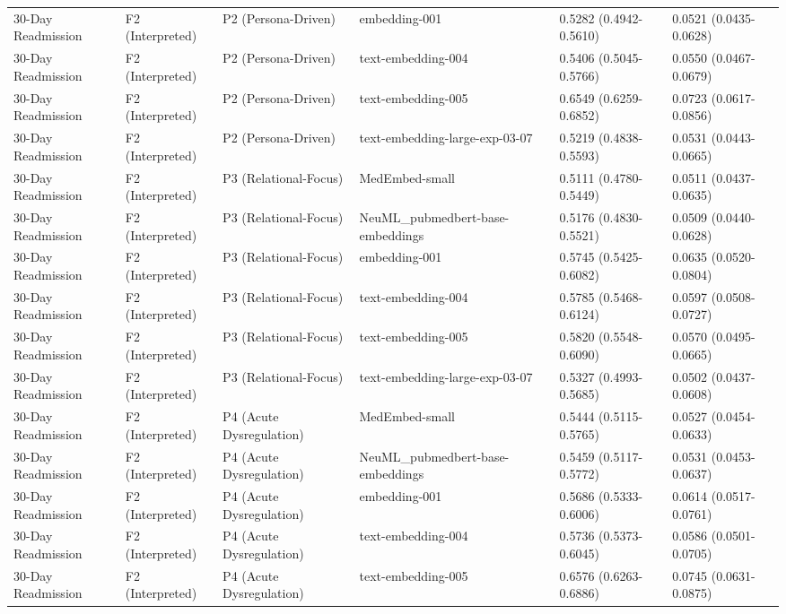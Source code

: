 \documentclass[border=0pt]{standalone}
\begin{document}
\begin{adjustbox}{width=\textwidth}
\begin{tabular}{llllll}
30-Day Readmission & F2 (Interpreted) & P2 (Persona-Driven) & embedding-001 & 0.5282 (0.4942-0.5610) & 0.0521 (0.0435-0.0628) \\
30-Day Readmission & F2 (Interpreted) & P2 (Persona-Driven) & text-embedding-004 & 0.5406 (0.5045-0.5766) & 0.0550 (0.0467-0.0679) \\
30-Day Readmission & F2 (Interpreted) & P2 (Persona-Driven) & text-embedding-005 & 0.6549 (0.6259-0.6852) & 0.0723 (0.0617-0.0856) \\
30-Day Readmission & F2 (Interpreted) & P2 (Persona-Driven) & text-embedding-large-exp-03-07 & 0.5219 (0.4838-0.5593) & 0.0531 (0.0443-0.0665) \\
30-Day Readmission & F2 (Interpreted) & P3 (Relational-Focus) & MedEmbed-small & 0.5111 (0.4780-0.5449) & 0.0511 (0.0437-0.0635) \\
30-Day Readmission & F2 (Interpreted) & P3 (Relational-Focus) & NeuML\_pubmedbert-base-embeddings & 0.5176 (0.4830-0.5521) & 0.0509 (0.0440-0.0628) \\
30-Day Readmission & F2 (Interpreted) & P3 (Relational-Focus) & embedding-001 & 0.5745 (0.5425-0.6082) & 0.0635 (0.0520-0.0804) \\
30-Day Readmission & F2 (Interpreted) & P3 (Relational-Focus) & text-embedding-004 & 0.5785 (0.5468-0.6124) & 0.0597 (0.0508-0.0727) \\
30-Day Readmission & F2 (Interpreted) & P3 (Relational-Focus) & text-embedding-005 & 0.5820 (0.5548-0.6090) & 0.0570 (0.0495-0.0665) \\
30-Day Readmission & F2 (Interpreted) & P3 (Relational-Focus) & text-embedding-large-exp-03-07 & 0.5327 (0.4993-0.5685) & 0.0502 (0.0437-0.0608) \\
30-Day Readmission & F2 (Interpreted) & P4 (Acute Dysregulation) & MedEmbed-small & 0.5444 (0.5115-0.5765) & 0.0527 (0.0454-0.0633) \\
30-Day Readmission & F2 (Interpreted) & P4 (Acute Dysregulation) & NeuML\_pubmedbert-base-embeddings & 0.5459 (0.5117-0.5772) & 0.0531 (0.0453-0.0637) \\
30-Day Readmission & F2 (Interpreted) & P4 (Acute Dysregulation) & embedding-001 & 0.5686 (0.5333-0.6006) & 0.0614 (0.0517-0.0761) \\
30-Day Readmission & F2 (Interpreted) & P4 (Acute Dysregulation) & text-embedding-004 & 0.5736 (0.5373-0.6045) & 0.0586 (0.0501-0.0705) \\
30-Day Readmission & F2 (Interpreted) & P4 (Acute Dysregulation) & text-embedding-005 & 0.6576 (0.6263-0.6886) & 0.0745 (0.0631-0.0875) \\

\end{tabular}
\end{adjustbox}
\end{document}
